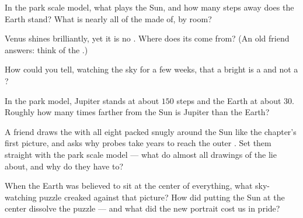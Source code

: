\begin{exercise}[$\star$]\label{exo:g4:solar-system:6}
In the park scale model, what plays the Sun, and how many steps
away does the Earth stand? What is nearly all of the
 made of, by room?
\end{exercise}

\begin{exercise}[$\star$]\label{exo:g4:solar-system:7}
Venus shines brilliantly, yet it is no . Where does its 
come from? (An old friend answers: think of the .)
\end{exercise}

\begin{exercise}[$\star$]\label{exo:g4:solar-system:8}
How could you tell, watching the sky for a few weeks, that a bright
 is a  and not a ?
\end{exercise}

\begin{exercise}[$\star$]\label{exo:g4:solar-system:9}
In the park model, Jupiter stands at about $150$ steps and the
Earth at about $30$. Roughly how many times farther from the Sun is
Jupiter than the Earth?
\end{exercise}

\begin{exercise}[$\star\star$]\label{exo:g4:solar-system:10}
A friend draws the  with all eight  packed
snugly around the Sun like the chapter's first picture, and asks
why probes take years to reach the outer . Set them straight
with the park scale model --- what do almost all drawings of the
 lie about, and why do they have to?
\end{exercise}

\begin{exercise}[$\star\star$]\label{exo:g4:solar-system:11}
When the Earth was believed to sit at the center of everything,
what sky-watching puzzle creaked against that picture? How did
putting the Sun at the center dissolve the puzzle --- and what did
the new portrait cost us in pride?
\end{exercise}
